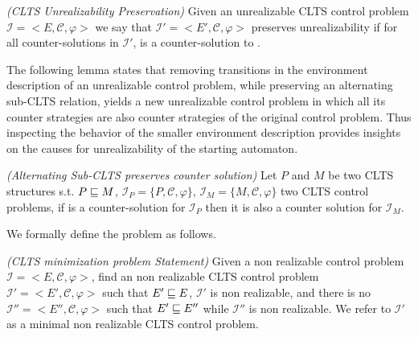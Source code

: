 \begin{definition}\label{}\emph{(CLTS Unrealizability Preservation)}
	Given an unrealizable CLTS control problem $\mathcal{I} = <E, \mathcal{C}, \varphi>$ we say
	that $\mathcal{I'} = <E', \mathcal{C}, \varphi>$ preserves unrealizability
	if for all counter-solutions \advCtrl in $\mathcal{I'}$, \advCtrl is a counter-solution to \controlProblem.
\end{definition}

The following lemma states that removing transitions in the environment description of an unrealizable control problem, while preserving an alternating sub-CLTS relation, yields a new unrealizable control problem in which all its counter strategies are also counter strategies of the original control problem. Thus inspecting the behavior of the smaller environment description provides insights on the causes for unrealizability of the starting automaton.  

\begin{lemma}\emph{(Alternating Sub-CLTS preserves counter solution)}\label{theorem:sub_clts_preserves-non-realizability}
	Let $P$ and $M$ be two CLTS structures s.t. $P \sqsubseteq M$, 
	$\mathcal{I}_P = \lbrace P, \mathcal{C}, \varphi \rbrace$,
	$\mathcal{I}_M = \lbrace M, \mathcal{C}, \varphi \rbrace$
	two CLTS control problems, if
	\advCtrl is a counter-solution for $\mathcal{I}_P$ then it is also a counter solution for $\mathcal{I}_M$.
\end{lemma}


We formally define the problem as follows.

\begin{definition}\label{def:clts_ProblemStatement}\emph{(CLTS minimization problem Statement)}
	Given a non realizable control problem $\mathcal{I} = <E, \mathcal{C}, \varphi>$, find an non realizable CLTS control problem $\mathcal{I'} = <E', \mathcal{C}, \varphi>$ such that $E' \sqsubseteq E$, $\mathcal{I'}$ is non realizable, and there is no $\mathcal{I''} = <E'', \mathcal{C}, \varphi>$ such that $E' \sqsubseteq E''$ while $\mathcal{I''}$ is non realizable. We refer to $\mathcal{I'}$ as a minimal non realizable CLTS control problem.
\end{definition}
